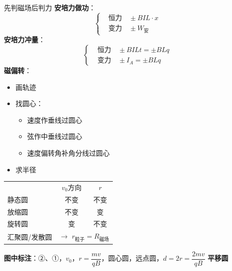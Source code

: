 先判磁场后判力
\textbf{安培力做功}：
\[
\left\{\begin{aligned}
&\text{恒力}\quad \pm BIL\cdot x\\
&\text{变力}\quad \pm W_{\text{安}}
\end{aligned}\right.
\]
\textbf{安培力冲量}：
\[
\left\{\begin{aligned}
&\text{恒力}\quad \pm BILt=\pm BLq\\
&\text{变力}\quad \pm I_{A}=\pm BLq
\end{aligned}\right.
\]
\textbf{磁偏转}：
\begin{itemize}
\item 画轨迹
\item 找圆心：
\begin{itemize}
\item 速度作垂线过圆心
\item 弦作中垂线过圆心
\item 速度偏转角补角分线过圆心
\end{itemize}
\item 求半径
\end{itemize}
\begin{center}
\begin{tabular}{lcc}
 & $v_0$方向 & $r$\\
静态圆 & 不变 & 不变\\
放缩圆 & 不变 & 变\\
旋转圆 & 变 & 不变\\
汇聚圆/发散圆 & \multicolumn{2}{l}{$\to$ $r_{\text{粒子}}=R_{\text{磁场}}$}
\end{tabular}
\end{center}
\textbf{图中标注}：②、①，$v_0$，$r=\dfrac{mv}{qB}$，圆心圆，远点圆，$d=2r=\dfrac{2mv}{qB}$
\textbf{平移圆}
